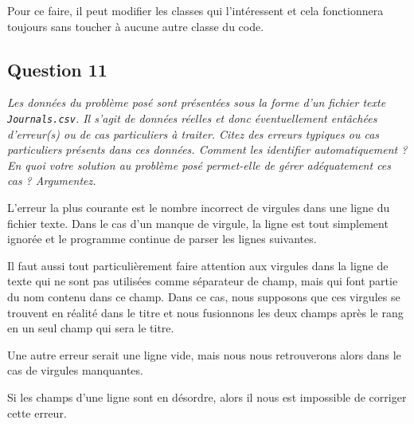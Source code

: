 \documentclass[11pt]{article}
\begin{document}
Pour ce faire, il peut modifier les classes qui l'intéressent et cela fonctionnera toujours sans toucher à aucune autre classe du code.

\subsection*{Question 11}
\textit{Les données du problème posé sont présentées sous la forme d’un fichier texte \texttt{Journals.csv}. Il s’agit de données réelles et donc éventuellement entâchées d’erreur(s) ou de cas particuliers à traiter. Citez des erreurs typiques ou cas particuliers présents dans ces données. Comment les identifier automatiquement ? En quoi votre solution au problème posé permet-elle de gérer adéquatement ces cas ? Argumentez.} \\ \medskip


L'erreur la plus courante est le nombre incorrect de virgules dans une ligne du fichier texte. Dans le cas d'un manque de virgule, la ligne est tout simplement ignorée et le programme continue de parser les lignes suivantes.

Il faut aussi tout particulièrement faire attention aux virgules dans la ligne de texte qui ne sont pas utilisées comme séparateur de champ, mais qui font partie du nom contenu dans ce champ.
Dans ce cas, nous supposons que ces virgules se trouvent en réalité dans le titre et nous fusionnons les deux champs après le rang en un seul champ qui sera le titre.

Une autre erreur serait une ligne vide, mais nous nous retrouverons alors dans le cas de virgules manquantes.

Si les champs d'une ligne sont en désordre, alors il nous est impossible de corriger cette erreur.
\end{document}

